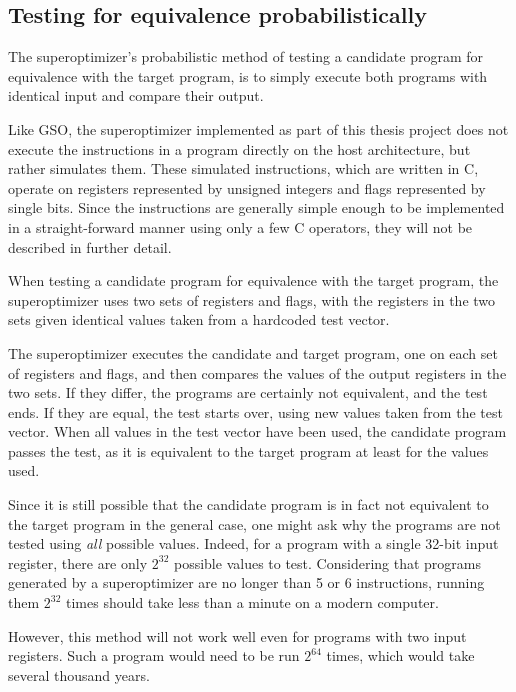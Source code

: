 \documentclass[a4paper,11pt]{kth-mag}
\begin{document}
\subsection{Testing for equivalence probabilistically}
\label{ss:probabilistic_test}

The superoptimizer's probabilistic method of testing a candidate program for equivalence with the target program, is to simply execute both programs with identical input and compare their output.

Like GSO, the superoptimizer implemented as part of this thesis project does not execute the instructions in a program directly on the host architecture, but rather simulates them.
These simulated instructions, which are written in C, operate on registers represented by unsigned integers and flags represented by single bits.
Since the instructions are generally simple enough to be implemented in a straight-forward manner using only a few C operators, they will not be described in further detail.

When testing a candidate program for equivalence with the target program, the superoptimizer uses two sets of registers and flags, with the registers in the two sets given identical values taken from a hardcoded test vector.

The superoptimizer executes the candidate and target program, one on each set of registers and flags, and then compares the values of the output registers in the two sets.
If they differ, the programs are certainly not equivalent, and the test ends.
If they are equal, the test starts over, using new values taken from the test vector.
When all values in the test vector have been used, the candidate program passes the test, as it is equivalent to the target program at least for the values used.

Since it is still possible that the candidate program is in fact not equivalent to the target program in the general case, one might ask why the programs are not tested using \emph{all} possible values.
Indeed, for a program with a single 32-bit input register, there are only $2^{32}$ possible values to test.
Considering that programs generated by a superoptimizer are no longer than 5 or 6 instructions, running them $2^{32}$ times should take less than a minute on a modern computer.

However, this method will not work well even for programs with two input registers.
Such a program would need to be run $2^{64}$ times, which would take several thousand years.
\end{document}
